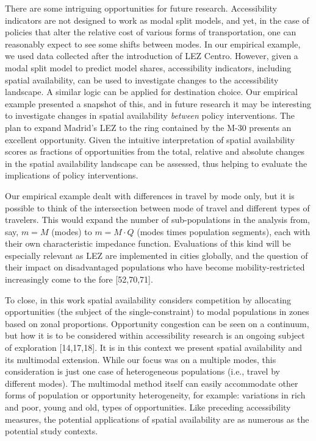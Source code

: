 \documentclass[10pt,letterpaper]{article}
\begin{document}
There are some intriguing opportunities for future research.
Accessibility indicators are not designed to work as modal split models,
and yet, in the case of policies that alter the relative cost of various
forms of transportation, one can reasonably expect to see some shifts
between modes. In our empirical example, we used data collected after
the introduction of LEZ Centro. However, given a modal split model to
predict model shares, accessibility indicators, including spatial
availability, can be used to investigate changes to the accessibility
landscape. A similar logic can be applied for destination choice. Our
empirical example presented a snapshot of this, and in future research
it may be interesting to investigate changes in spatial availability
\emph{between} policy interventions. The plan to expand Madrid's LEZ to
the ring contained by the M-30 presents an excellent opportunity. Given
the intuitive interpretation of spatial availability scores as fractions
of opportunities from the total, relative and absolute changes in the
spatial availability landscape can be assessed, thus helping to evaluate
the implications of policy interventions.

Our empirical example dealt with differences in travel by mode only, but
it is possible to think of the intersection between mode of travel and
different types of travelers. This would expand the number of
sub-populations in the analysis from, say, \(m=M\) (modes) to
\(m = M\cdot Q\) (modes times population segments), each with their own
characteristic impedance function. Evaluations of this kind will be
especially relevant as LEZ are implemented in cities globally, and the
question of their impact on disadvantaged populations who have become
mobility-restricted increasingly come to the fore {[}52,70,71{]}.

To close, in this work spatial availability considers competition by
allocating opportunities (the subject of the single-constraint) to modal
populations in zones based on zonal proportions. Opportunity congestion
can be seen on a continuum, but how it is to be considered within
accessibility research is an ongoing subject of exploration
{[}14,17,18{]}. It is in this context we present spatial availability
and its multimodal extension. While our focus was on a multiple modes,
this consideration is just one case of heterogeneous populations (i.e.,
travel by different modes). The multimodal method itself can easily
accommodate other forms of population or opportunity heterogeneity, for
example: variations in rich and poor, young and old, types of
opportunities. Like preceding accessibility measures, the potential
applications of spatial availability are as numerous as the potential
study contexts.
\end{document}
